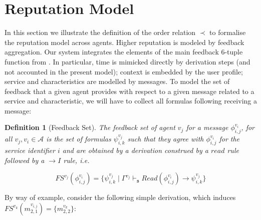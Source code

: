 \documentclass[compsoc, conference, letterpaper, 10pt, times]{IEEEtran}
\newtheorem{definition}{Definition}
\begin{document}
\section{Reputation Model}

In this section we illustrate the definition of the order relation $\prec$ to formalise the reputation model across agents. Higher reputation is modeled by feedback aggregation. Our system integrates the elements of the main feedback 6-tuple function from \cite{xxx}. In particular, time is mimicked directly by derivation steps (and not accounted in the present model); context is embedded by the user profile; service and characteristics are modelled by messages. To model the set of feedback that a given agent provides with respect to a given message related to a service and characteristic, we will have to collect all formulas following receiving a message:

\begin{definition}[Feedback Set]
The feedback set of agent $v_{j}$ for a message $\phi^{v_{i}}_{i,j}$, for all $v_{j}, v_{i} \in \mathcal{A}$ is the set of formulas $\psi^{v_{j}}_{i,k}$ such that they agree with $\phi^{v_{i}}_{i,j}$ for the service identifier $i$ and are obtained by a derivation construed by a $read$ rule followed by a $\rightarrow I$ rule, i.e.

\[
FS^{v_{j}}(\phi^{v_{i}}_{i,j})=\{ \psi^{v_{j}}_{i,k}\mid \Gamma^{v_{j}}
\vdash_{\mathtt{s}}  Read(\phi^{v_{i}}_{i,j})\rightarrow \psi^{v_{j}}_{i,k}  \}
\]

\end{definition}


By way of example, consider the following simple derivation, which induces $FS^{v_{k}}(m^{v_{i,j}}_{2,1})=\{m^{v_{k}}_{2,2}\}$: 

\begin{figure*}
\begin{footnotesize}

	\begin{prooftree}
		
		\end{prooftree}
\end{footnotesize}


	\caption{An Example Feedback Set}\label{fig:ask}

\end{figure*}
\end{document}
